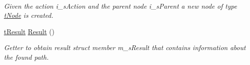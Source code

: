 \begin{DoxyCompactItemize}
$$\begin{DoxyCompactList}\small\item\em Given the action i\+\_\+s\+Action and the parent node i\+\_\+s\+Parent a new node of type \mbox{\hyperlink{structplanner_1_1t_node}{t\+Node}} is created. \end{DoxyCompactList}\item 
\mbox{\label{classplanner_1_1c_planner_interface_af7a88d017115e9bfee25c12091062641}} 
\mbox{\hyperlink{structt_result}{t\+Result}} \mbox{\hyperlink{classplanner_1_1c_planner_interface_af7a88d017115e9bfee25c12091062641}{Result}} ()
\begin{DoxyCompactList}\small\item\em Getter to obtain result struct member m\+\_\+s\+Result that contains information about the found path. \end{DoxyCompactList}\end{DoxyCompactItemize}
